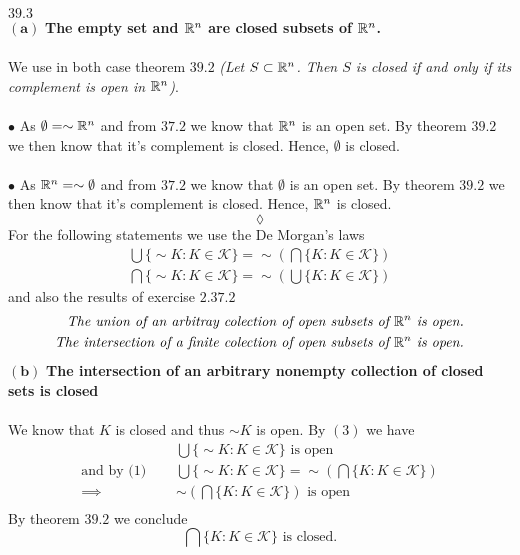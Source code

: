 $\mathbf{39.3}$\\ 
$\mathbf{(a)}$ \textbf{The empty set and $\mathbb{R}^n$ are closed subsets of $\mathbb{R}^n$.\\\\}
We use in both case theorem $\mathbf{39.2}$ \textit{(Let $S \subset \mathbb{R}^n$. Then $S$ is closed if and only if its complement
is open in $\mathbb{R}^n$)}.\\\\
$\bullet$ As $\emptyset=\sim \mathbb{R}^n$ and from $\mathbf{37.2}$ we know that  $\mathbb{R}^n$ is an open set. By theorem $\mathbf{39.2}$ we then know that it's complement is closed. Hence, $\emptyset$ is closed. \\\\
$\bullet$ As $\mathbb{R}^n =\sim \emptyset $ and from $\mathbf{37.2}$ we know that  $\emptyset$ is an open set. By theorem $\mathbf{39.2}$ we then know that it's complement is closed. Hence, $\mathbb{R}^n$ is closed. 
$$\lozenge$$
For the following statements we use the De Morgan's laws
\begin{align}
\bigcup\{\sim K:K\in\mathscr{K}\} = \sim \left(\bigcap\{ K:K\in\mathscr{K}\}\right)\\
\bigcap\{\sim K:K\in\mathscr{K}\} = \sim \left(\bigcup\{ K:K\in\mathscr{K}\}\right)
\end{align}
 and also the results of exercise $\mathbf{2.37.2}$
 \begin{align}
 \textit{The union of an arbitray colection of open subsets of }\mathbb{R}^n\textit{ is open.}\\
 \textit{The intersection  of a finite colection of open subsets of }\mathbb{R}^n\textit{ is open.}
 \end{align}
$\mathbf{(b)}$ \textbf{The intersection of an arbitrary nonempty collection of closed sets is closed}\\\\
We know that $K$ is closed and thus $\sim K$ is open. By $(3)$ we have
\begin{align*}
& \bigcup\{\sim K:K\in\mathscr{K}\} \text{ is open}\\
\text{and by (1) }\quad  & \bigcup\{\sim K:K\in\mathscr{K}\} = \sim \left(\bigcap\{ K:K\in\mathscr{K}\}\right)\\
\implies\quad &   \sim\left(\bigcap\{ K:K\in\mathscr{K}\}\right) \text{ is open}\\
\end{align*}
By theorem $\mathbf{39.2}$ we conclude 
$$\bigcap\{ K:K\in\mathscr{K}\} \text{ is closed.}$$\\\\
